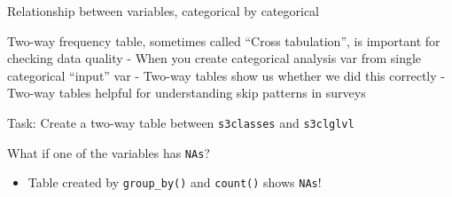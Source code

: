 \documentclass[8pt,ignorenonframetext,dvipsnames]{beamer}
\newenvironment{Shaded}{\begin{snugshade}}{\end{snugshade}}
\newcommand{\KeywordTok}[1]{\textcolor[rgb]{0.13,0.29,0.53}{\textbf{#1}}}
\newcommand{\DataTypeTok}[1]{\textcolor[rgb]{0.13,0.29,0.53}{#1}}
\newcommand{\DecValTok}[1]{\textcolor[rgb]{0.00,0.00,0.81}{#1}}
\newcommand{\StringTok}[1]{\textcolor[rgb]{0.31,0.60,0.02}{#1}}
\newcommand{\OtherTok}[1]{\textcolor[rgb]{0.56,0.35,0.01}{#1}}
\newcommand{\OperatorTok}[1]{\textcolor[rgb]{0.81,0.36,0.00}{\textbf{#1}}}
\newcommand{\NormalTok}[1]{#1}
\providecommand{\tightlist}{%
  \setlength{\itemsep}{0pt}\setlength{\parskip}{0pt}}
\renewcommand{\textbf}[1]{{\color{darkgray}\bfseries\fontfamily{Montserrat-TOsF}#1}}
\begin{document}
\begin{frame}[fragile]{Relationship between variables, categorical by
categorical}

Two-way frequency table, sometimes called ``Cross tabulation'', is
important for checking data quality - When you create categorical
analysis var from single categorical ``input'' var - Two-way tables show
us whether we did this correctly - Two-way tables helpful for
understanding skip patterns in surveys

Task: Create a two-way table between \texttt{s3classes} and
\texttt{s3clglvl}

\begin{Shaded}
\end{Shaded}

What if one of the variables has \texttt{NAs}?

\begin{itemize}
\tightlist
\item
  Table created by \texttt{group\_by()} and \texttt{count()} shows
  \texttt{NAs}!
\end{itemize}

\begin{Shaded}
\end{Shaded}

\end{frame}
\end{document}
